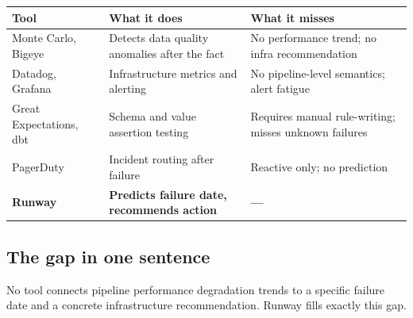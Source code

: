 \begin{center}
\small
\begin{tabularx}{0.96\textwidth}{l X X}
  \toprule
  \textbf{Tool} & \textbf{What it does} & \textbf{What it misses} \\
  \midrule
  Monte Carlo, Bigeye     & Detects data quality anomalies after the fact    & No performance trend; no infra recommendation \\
  Datadog, Grafana        & Infrastructure metrics and alerting              & No pipeline-level semantics; alert fatigue \\
  Great Expectations, dbt & Schema and value assertion testing               & Requires manual rule-writing; misses unknown failures \\
  PagerDuty               & Incident routing after failure                   & Reactive only; no prediction \\
  \textbf{Runway}         & \textbf{Predicts failure date, recommends action} & \textbf{—} \\
  \bottomrule
\end{tabularx}
\end{center}

\vspace{4pt}

\subsection{The gap in one sentence}

\begin{insight}
No tool connects pipeline performance degradation trends to a specific failure date and
a concrete infrastructure recommendation. Runway fills exactly this gap.
\end{insight}
